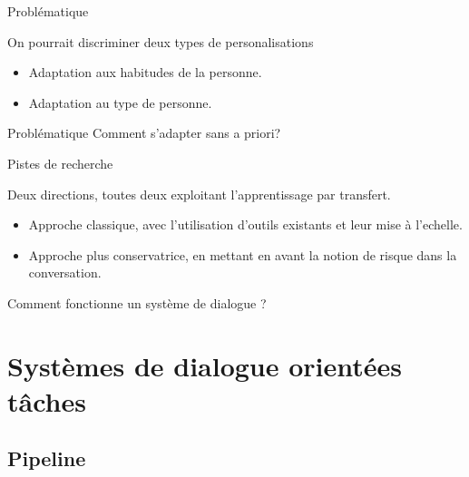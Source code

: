 \documentclass[french]{beamer}
\begin{document}
    \begin{frame}{Problématique}

        On pourrait discriminer deux types de personalisations

        \begin{itemize}
            \item Adaptation aux habitudes de la personne.
            \item Adaptation au type de personne.
        \end{itemize}


        \begin{alertblock}{Problématique}
            Comment s'adapter sans a priori?
        \end{alertblock}

    \end{frame}

    \begin{frame}{Pistes de recherche}

        Deux directions, toutes deux exploitant l'apprentissage par transfert.

        \begin{itemize}
            \item Approche classique, avec l'utilisation d'outils existants et leur mise à l'echelle.
            \item Approche plus conservatrice, en mettant en avant la notion de risque dans la conversation.
        \end{itemize}


        Comment fonctionne un système de dialogue ?

    \end{frame}

    \section{Systèmes de dialogue orientées tâches}



    \subsection{Pipeline}
\end{document}
